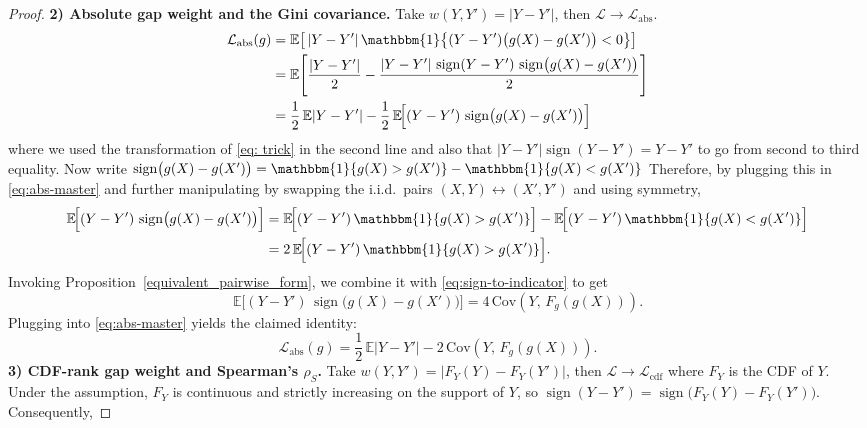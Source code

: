 \documentclass[11pt]{article}
\theoremstyle{plain}
\theoremstyle{plain}
\theoremstyle{plain}
\theoremstyle{plain}
\theoremstyle{plain}
\theoremstyle{plain}
\theoremstyle{plain}
\begin{document}
\begin{proof}
\medskip
\noindent\textbf{2) Absolute gap weight and the Gini covariance.}
Take $w(Y,Y')=|Y-Y'|$, then $\mathcal{L}\xrightarrow{}\mathcal{L}_{\mathrm{abs}}$. 
\begin{align}
\mathcal{L}_{\mathrm{abs}}(g)
&= \mathbb{E}\!\left[\,|Y-Y'|\,\mathbbm{1}\!\left\{(Y-Y')\big(g(X)-g(X')\big)<0\right\}\right] \nonumber \\
&= \mathbb{E}\!\left[\frac{|Y-Y'|}{2}
-\frac{|Y-Y'|\,\operatorname{sign}(Y-Y')\,\operatorname{sign}\!\big(g(X)-g(X')\big)}{2}\right] \nonumber \\
&= \frac12\,\mathbb{E}|Y-Y'|
-\frac12\,\mathbb{E}\!\Big[(Y-Y')\,\operatorname{sign}\!\big(g(X)-g(X')\big)\Big]
\label{eq:abs-master}
\end{align}
where we used the transformation of \eqref{eq: trick} in the second line and also that $|Y-Y'|\operatorname{sign}(Y-Y')=Y-Y'$ to go from second to third equality. Now write $\operatorname{sign}\!\big(g(X)-g(X')\big) = \mathbbm{1}\{g(X)>g(X')\}-\mathbbm{1}\{g(X)<g(X')\}$
Therefore, by plugging this in \eqref{eq:abs-master} and further manipulating by swapping the i.i.d.\ pairs $(X,Y)\leftrightarrow (X',Y')$ and using symmetry,
\begin{align}
\mathbb{E}\!\Big[(Y-Y')\,\operatorname{sign}\!\big(g(X)-g(X')\big)\Big]
&=
\mathbb{E}\!\Big[(Y-Y')\,\mathbbm{1}\{g(X)>g(X')\}\Big]
-\mathbb{E}\!\Big[(Y-Y')\,\mathbbm{1}\{g(X)<g(X')\}\Big] \nonumber \\
&= 2\,\mathbb{E}\!\Big[(Y-Y')\,\mathbbm{1}\{g(X)>g(X')\}\Big].
\label{eq:sign-to-indicator}
\end{align}
Invoking Proposition~\ref{equivalent_pairwise_form}, we combine it with \eqref{eq:sign-to-indicator} to get
\[
\mathbb{E}\!\Big[(Y-Y')\,\operatorname{sign}\!\big(g(X)-g(X')\big)\Big]
=
4\,\mathrm{Cov}\!\left(Y,\,F_g(g(X))\right).
\]
Plugging into \eqref{eq:abs-master} yields the claimed identity:
\[
\mathcal{L}_{\mathrm{abs}}(g)
=
\frac12\,\mathbb{E}|Y-Y'|
-2\,\mathrm{Cov}\!\left(Y,\,F_g(g(X))\right) .
\]
\medskip
\noindent\textbf{3) CDF-rank gap weight and Spearman's $\rho_S$.}
Take $w(Y,Y')=\big|F_Y(Y)-F_Y(Y')\big|$, then $\mathcal{L}\xrightarrow{}\mathcal{L}_{\mathrm{cdf}}$ where $F_Y$ is the CDF of $Y$.
Under the assumption, $F_Y$ is continuous and strictly increasing on the support of $Y$, so $\operatorname{ sign}(Y-Y')=\operatorname{sign}\!\big(F_Y(Y)-F_Y(Y')\big)$. Consequently, 

\end{proof}
\end{document}
